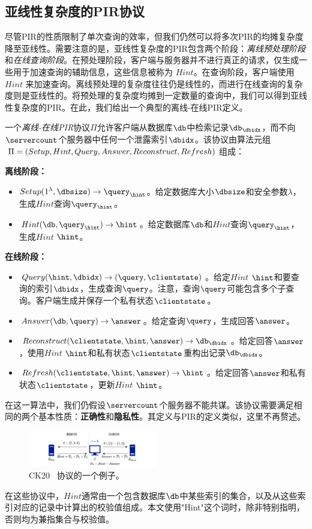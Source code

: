 \subsection{亚线性复杂度的PIR协议}
尽管PIR的性质限制了单次查询的效率，但我们仍然可以将多次PIR的均摊复杂度降至亚线性。需要注意的是，亚线性复杂度的PIR包含两个阶段：\textit{离线预处理阶段}和\textit{在线查询阶段}。在预处理阶段，客户端与服务器并不进行真正的请求，仅生成一些用于加速查询的辅助信息，这些信息被称为 $Hint$。在查询阶段，客户端使用 $Hint$ 来加速查询。离线预处理的复杂度往往仍是线性的，而进行在线查询的复杂度则是亚线性的。将预处理的复杂度均摊到一定数量的查询中，我们可以得到亚线性复杂度的PIR。在此，我们给出一个典型的离线-在线PIR定义\cite{EC:CorKog20}。

\begin{definition}[离线-在线PIR]
    一个\textit{离线-在线PIR}协议$\Pi$允许客户端从数据库$\db$中检索记录$\db_\dbidx$，而不向$\servercount$个服务器中任何一个泄露索引$\dbidx$。该协议由算法元组$\Pi = (Setup, Hint,\\ Query, Answer, Reconstruct, Refresh)$组成：

    \noindent \textbf{离线阶段：}
    \begin{itemize}
        \item $Setup(1^\lambda,\dbsize) \rightarrow \query_\hint$。给定数据库大小$\dbsize$和安全参数$\lambda$，生成$Hint$查询$\query_\hint$。
        \item $Hint(\db, \query_\hint) \rightarrow \hint$。给定数据库$\db$和$Hint$查询$\query_\hint$，生成$Hint$ $\hint$。
    \end{itemize}
    \noindent \textbf{在线阶段：}
    \begin{itemize}
        \item $Query(\hint, \dbidx) \rightarrow (\query, \clientstate)$。给定$Hint$ $\hint$和要查询的索引$\dbidx$，生成查询$\query$。注意，查询$\query$可能包含多个子查询。客户端生成并保存一个私有状态$\clientstate$。
        \item $Answer(\db, \query) \rightarrow \answer$。给定查询$\query$，生成回答$\answer$。
        \item $Reconstruct(\clientstate, \hint, \answer) \rightarrow \db_\dbidx$。给定回答$\answer$，使用$Hint$ $\hint$和私有状态$\clientstate$重构出记录$\db_\dbidx$。
        \item $Refresh(\clientstate, \hint, \answer) \rightarrow \hint$。给定回答$\answer$和私有状态$\clientstate$，更新$Hint$ $\hint$。
    \end{itemize}
    在这一算法中，我们仍假设$\servercount$个服务器不能共谋。该协议需要满足相同的两个基本性质：\textbf{正确性}和\textbf{隐私性}。其定义与PIR的定义类似，这里不再赘述。
\end{definition}

\begin{figure}
    \centering
    \includegraphics[width=0.5\textwidth]{figure/ck20.png}
    \caption{CK20~\cite{EC:CorKog20} 协议的一个例子。}
    \label{fig:CK20}
\end{figure}

在这些协议中，$Hint$通常由一个包含数据库$\db$中某些索引的集合，以及从这些索引对应的记录中计算出的校验值组成。本文使用"Hint"这个词时，除非特别指明，否则均为兼指集合与校验值。